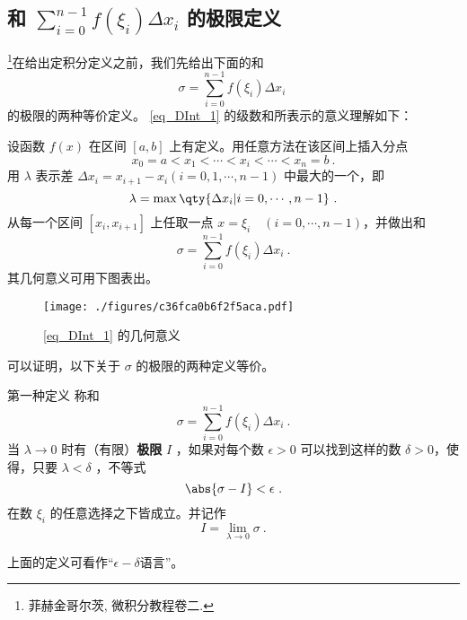 
\subsection{和 $\sum\limits_{i=0}^{n-1}f(\xi_i)\Delta x_i$ 的极限定义}
\footnote{菲赫金哥尔茨, 微积分教程卷二.}在给出定积分定义之前，我们先给出下面的和
\begin{equation}\label{eq_DInt_1}
\sigma=\sum_{i=0}^{n-1}f(\xi_i)\Delta x_i~
\end{equation}
的极限的两种等价定义。
\autoref{eq_DInt_1} 的级数和所表示的意义理解如下：

设函数 $f(x)$ 在区间 $[a,b]$ 上有定义。用任意方法在该区间上插入分点
\begin{equation}
x_0=a<x_1<\cdots<x_i<\cdots<x_n=b~.
\end{equation}
用 $\lambda$ 表示差 $\Delta x_i=x_{i+1}-x_i(i=0,1,\cdots,n-1)$ 中最大的一个，即
\begin{equation}
\lambda=\max\qty{\Delta x_i|i=0,\cdots,n-1}~.
\end{equation}
从每一个区间 $[x_i,x_{i+1}]$ 上任取一点 $x=\xi_i\quad (i=0,\cdots,n-1)$，并做出和
\begin{equation}
\sigma=\sum_{i=0}^{n-1}f(\xi_i)\Delta x_i~.
\end{equation}
其几何意义可用下图表出。
\begin{figure}[ht]
\centering
\texttt{[image: ./figures/c36fca0b6f2f5aca.pdf]}
\caption{\autoref{eq_DInt_1} 的几何意义} \label{fig_DInt1}
\end{figure}
可以证明，以下关于 $\sigma$ 的极限的两种定义等价。
\begin{definition}{第一种定义}\label{def_DInt_1}
称和
\begin{equation}
\sigma=\sum_{i=0}^{n-1}f(\xi_i)\Delta x_i~.
\end{equation}
当 $\lambda\rightarrow0$ 时有（有限）\textbf{极限} $I$ ，如果对每个数 $\epsilon>0$ 可以找到这样的数 $\delta>0$，使得，只要 $\lambda<\delta$ ，不等式
\begin{equation}
\abs{\sigma-I}<\epsilon~.
\end{equation}
在数 $\xi_i$ 的任意选择之下皆成立。并记作
\begin{equation}
I=\lim_{\lambda\rightarrow0}\sigma~.
\end{equation}
\end{definition}
上面的定义可看作“$\epsilon-\delta$语言”。 

